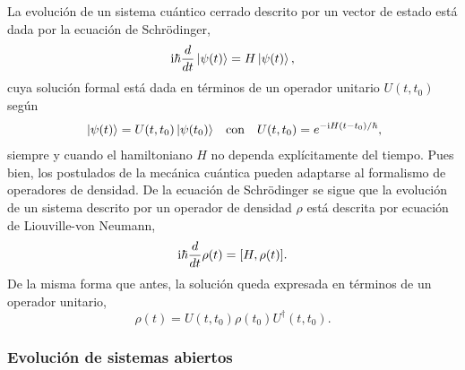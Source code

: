 La evolución de un sistema cuántico cerrado descrito por un vector de estado está dada por la ecuación de Schrödinger,
\begin{equation}
    \text{i}\hbar\frac{d}{dt}\ket{\psi(t)}=H\ket{\psi(t)},\nonumber
\end{equation}
cuya solución formal está dada en términos de un operador unitario $U(t,t_{0})$ según
\begin{align}
    \ket{\psi(t)}=U(t,t_{0})\ket{\psi(t_{0})} && \text{con} && U(t,t_{0})=e^{-\rmi H(t-t_{0})/\hbar}\rlap{,}\nonumber
\end{align}
siempre y cuando el hamiltoniano $H$ no dependa explícitamente del tiempo. Pues bien, los postulados de la mecánica cuántica pueden adaptarse al formalismo de operadores de densidad. De la ecuación de Schrödinger se sigue que la evolución de un sistema descrito por un operador de densidad $\rho$ está descrita por ecuación de Liouville-von Neumann,
\begin{equation}
    \text{i}\hbar\frac{d}{d t} \rho(t)=[H,\rho(t)].\nonumber
\end{equation}
De la misma forma que antes, la solución queda expresada en términos de un operador unitario,
\begin{equation}
    \rho(t)=U(t,t_{0})\rho(t_{0})U^{\dagger}(t,t_{0}).\nonumber
\end{equation}

\subsubsection{Evolución de sistemas abiertos}


